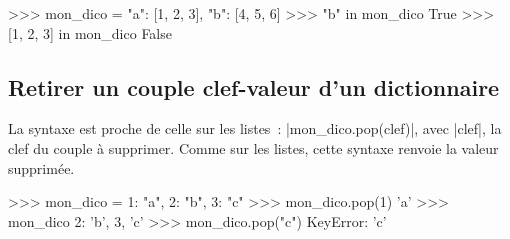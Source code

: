 		\begin{pythoncode}
			>>> mon_dico = {"a": [1, 2, 3], "b": [4, 5, 6]}
			>>> "b" in mon_dico
			True
			>>> [1, 2, 3] in mon_dico
			False
		\end{pythoncode}
	
	\subsection{Retirer un couple clef-valeur d'un dictionnaire}
		
		La syntaxe est proche de celle sur les listes~: \python|mon_dico.pop(clef)|, avec \python|clef|, la clef du couple à supprimer.
		Comme sur les listes, cette syntaxe renvoie la valeur supprimée.
		
		\begin{pythoncode}
			>>> mon_dico = {1: "a", 2: "b", 3: "c"}
			>>> mon_dico.pop(1)
			'a'
			>>> mon_dico
			{2: 'b', 3, 'c'}
			>>> mon_dico.pop("c")
			KeyError: 'c'
		\end{pythoncode}

			
		
		
			
			
		
		
		
		
		


